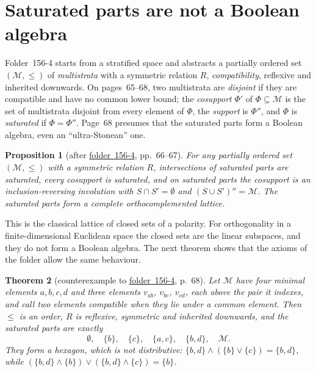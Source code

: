 \documentclass[11pt,a4paper]{amsart}
\newtheorem{theorem}{Theorem}[section]
\newtheorem{proposition}[theorem]{Proposition}
\theoremstyle{definition}
\theoremstyle{remark}
\newcommand{\cM}{\mathcal M}
\newcommand{\fac}[1]{\href{https://grothendieck.umontpellier.fr/#1.pdf}{folder~#1}}
\begin{document}
\section{Saturated parts are not a Boolean algebra}\label{sec:sat}

Folder~156-4 starts from a stratified space and abstracts a partially ordered set $(\cM, \le)$ of \emph{multistrata} with a symmetric relation $R$, \emph{compatibility}, reflexive and inherited downwards. On pages~65--68, two multistrata are \emph{disjoint} if they are compatible and have no common lower bound; the \emph{cosupport} $\Phi'$ of $\Phi \subseteq \cM$ is the set of multistrata disjoint from every element of $\Phi$, the \emph{support} is $\Phi''$, and $\Phi$ is \emph{saturated} if $\Phi = \Phi''$. Page~68 presumes that the saturated parts form a Boolean algebra, even an ``ultra-Stonean'' one.

\begin{proposition}[after \fac{156-4}, pp.~66--67]\label{prop:ortho}
For any partially ordered set $(\cM, \le)$ with a symmetric relation $R$, intersections of saturated parts are saturated, every cosupport is saturated, and on saturated parts the cosupport is an inclusion-reversing involution with $S \cap S' = \emptyset$ and $(S \cup S')'' = \cM$. The saturated parts form a complete orthocomplemented lattice.
\end{proposition}

This is the classical lattice of closed sets of a polarity. For orthogonality in a finite-dimensional Euclidean space the closed sets are the linear subspaces, and they do not form a Boolean algebra. The next theorem shows that the axioms of the folder allow the same behaviour.

\begin{theorem}[counterexample to \fac{156-4}, p.~68]\label{thm:hexagon}
Let $\cM$ have four minimal elements $a, b, c, d$ and three elements $v_{ab}$, $v_{bc}$, $v_{cd}$, each above the pair it indexes, and call two elements compatible when they lie under a common element. Then $\le$ is an order, $R$ is reflexive, symmetric and inherited downwards, and the saturated parts are exactly
\[
\emptyset,\quad \{b\},\quad \{c\},\quad \{a, c\},\quad \{b, d\},\quad \cM.
\]
They form a hexagon, which is not distributive: $\{b, d\} \wedge (\{b\} \vee \{c\}) = \{b, d\}$, while $(\{b, d\} \wedge \{b\}) \vee (\{b, d\} \wedge \{c\}) = \{b\}$.
\end{theorem}
\end{document}

